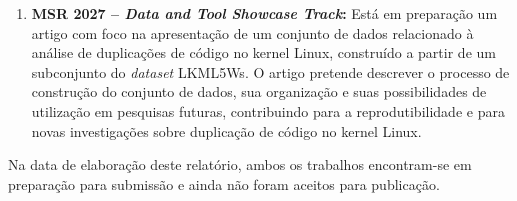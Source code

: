 \documentclass[oneside]{abntlatex}
\begin{document}
\begin{appendixenv}
\begin{enumerate}
\item \textbf{MSR 2027 -- \textit{Data and Tool Showcase Track}:} Está em preparação um artigo com foco na apresentação de um conjunto de dados relacionado à análise de duplicações de código no kernel Linux, construído a partir de um subconjunto do \textit{dataset} LKML5Ws\cite{passos2026lkml5ws}. O artigo pretende descrever o processo de construção do conjunto de dados, sua organização e suas possibilidades de utilização em pesquisas futuras, contribuindo para a reprodutibilidade e para novas investigações sobre duplicação de código no kernel Linux.
\end{enumerate}

Na data de elaboração deste relatório, ambos os trabalhos encontram-se em preparação para submissão e ainda não foram aceitos para publicação.


\end{appendixenv}
\end{document}
